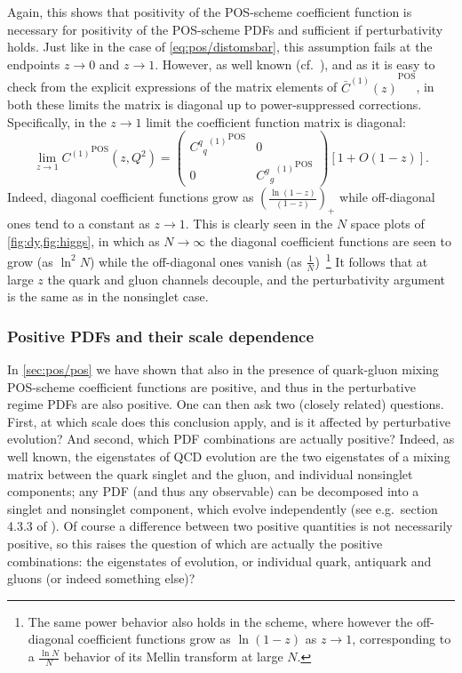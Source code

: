 Again, this shows that positivity of the POS-scheme  coefficient function is
necessary for positivity of the POS-scheme PDFs and sufficient if
perturbativity holds. Just like in the case of
\cref{eq:pos/distomsbar}, this assumption fails at the endpoints
$z\to0$ and $z\to 1$.
However, as well known (cf.\ \cite{Ellis:1991qj}), and as it is easy to check
from the explicit expressions of the matrix elements of ${\bar
C^{(1)}(z)}^{\textrm{POS}}$, in both these limits the matrix is diagonal up to
power-suppressed corrections.
Specifically, in the $z\to1$ limit the coefficient function matrix is
diagonal:
\begin{equation}\label{eq:pos/diag}
    \lim_{z\to 1}  {C^{(1)}}^{\textrm{POS}}(z,Q^2)=\left(\begin{array}{cc} {{{C^{q}}_q}^{(1)}}^{\textrm{POS}} &
      0 \\0 & {{{C^{g}}_g}^{(1)}}^{\textrm{POS}} \end{array}\right)\left[1+O(1-z)\right].
\end{equation}
Indeed, diagonal coefficient functions grow as
$\left(\frac{\ln(1-z)}{(1-z)}\right)_+$ while off-diagonal ones tend to a constant
as $z\to1$. This is clearly seen in the $N$ space plots of
\cref{fig:dy,fig:higgs}, in which as $N\to\infty$ the diagonal coefficient
functions are seen to grow (as $\ln^2N$) while the off-diagonal ones
vanish (as $\frac{1}{N}$)~\footnote{The same power behavior also
  holds in the \msbar{} scheme, where however the off-diagonal
  coefficient functions grow as $\ln(1-z)$ as $z\to 1$, corresponding
  to a $\frac{\ln N}{N}$ behavior of its Mellin transform at large $N$.}
It follows that at large $z$ the quark and gluon channels decouple, and
the perturbativity argument is the same as in the
nonsinglet case. 

\subsubsection{Positive PDFs and their scale dependence}
\label{sec:pos/ap}


In \cref{sec:pos/pos}
we have shown that also in the presence of quark-gluon
mixing  POS-scheme
coefficient functions are positive, and thus in the perturbative
regime PDFs are also positive. One can then ask two (closely related)
questions. First, at which scale does this conclusion apply, and is it
affected by perturbative evolution? And second, which PDF combinations
are actually positive?
Indeed, as well known, the eigenstates of QCD evolution are the two
eigenstates of a mixing matrix between the quark singlet and the
gluon,  and individual nonsinglet components; any PDF (and thus any
observable) can be decomposed into a singlet and nonsinglet component,
which evolve independently (see
e.g.\ section 4.3.3 of \cite{Ellis:1991qj}). Of course a difference
between two positive quantities is not necessarily positive, so this
raises the question of which are actually the positive combinations:
the eigenstates of evolution, or individual quark, antiquark and
gluons (or indeed something else)?

